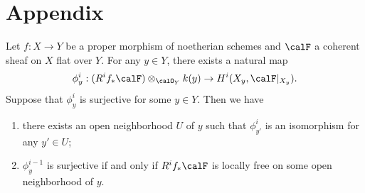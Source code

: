 \section{Appendix}


\begin{theorem}
	Let $f:X\to Y$ be a proper morphism of noetherian schemes and $\calF$ a coherent sheaf on $X$ flat over $Y$.
	For any $y\in Y$, there exists a natural map
	\[ \phi^i_y: (R^if_*\calF)\otimes_{\calO_Y} k(y) \to H^i(X_y, \calF|_{X_y}). \]
	Suppose that $\phi^i_y$ is surjective for some $y\in Y$.
	Then we have
	\begin{enumerate}
		\item there exists an open neighborhood $U$ of $y$ such that $\phi^i_{y'}$ is an isomorphism for any $y'\in U$;
		\item $\phi^{i-1}_y$ is surjective if and only if $R^if_*\calF$ is locally free on some open neighborhood of $y$.
	\end{enumerate}
	\Yang{}
\end{theorem}

